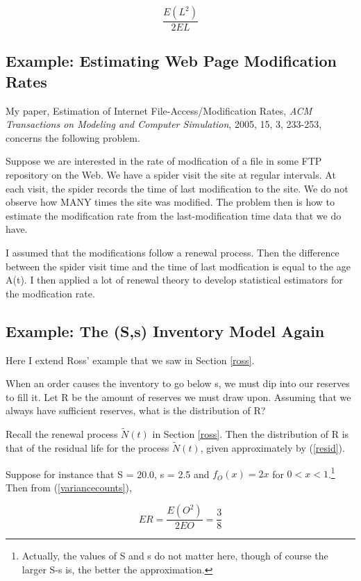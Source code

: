 \begin{equation}
\label{variancecounts}
\frac{E(L^2)}{2EL} 
\end{equation}

\subsection{Example:  Estimating Web Page Modification Rates}

My paper, Estimation of Internet File-Access/Modification Rates, {\it
ACM Transactions on Modeling and Computer Simulation}, 2005, 15, 3, 233-253,    
concerns the following problem.  

Suppose we are interested in the rate of modfication of a file in some
FTP repository on the Web.  We have a spider visit the site at regular
intervals.  At each visit, the spider records the time of last
modification to the site.  We do not observe how MANY times the site was
modified.  The problem then is how to estimate the modification rate
from the last-modification time data that we do have. 

I assumed that the modifications follow a renewal process.  Then the
difference between the spider visit time and the time of last
modfication is equal to the age A(t).  I then applied a lot of renewal
theory to develop statistical estimators for the modfication rate.  

\subsection{Example:  The (S,s) Inventory Model Again}
\label{dip}

Here I extend Ross' example that we saw in Section \ref{ross}.

When an order causes the inventory to go below s, we must dip into our
reserves to fill it.  Let R be the amount of reserves we must draw upon.
Assuming that we always have sufficient reserves, what is the
distribution of R?

Recall the renewal process $\tilde{N}(t)$ in Section \ref{ross}.  Then
the distribution of R is that of the residual life for the process
$\tilde{N}(t)$, given approximately by (\ref{resid}).

Suppose for instance that S = 20.0, s = 2.5 and $f_O(x) = 2x$ for $0 < x
< 1$.\footnote{Actually, the values of S and s do not matter here,
though of course the larger S-s is, the better the approximation.}  Then 
from (\ref{variancecounts}),

\begin{equation}
ER = \frac{E(O^2)}{2EO} = \frac{3}{8} 
\end{equation}

